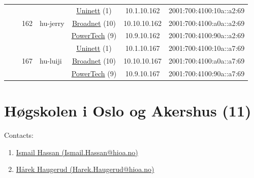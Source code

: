 \begin{small}
\begin{center}
\begin{longtable}{|c|c|c|c|c|c|c|c|}
  &  & \multirow{3}{*}{\tiny{162}} & \multicolumn{1}{|l|}{\multirow{3}{*}{\tiny{hu-jerry}}} & \multicolumn{2}{|c|}{\tiny{\href{https://www.uninett.no}{Uninett} (1)}} & \tiny{10.1.10.162} & \tiny{2001:700:4100:10a::a2:69} \\* \cline{5-5}\cline{6-6}\cline{7-7}\cline{8-8}
  &  &  &  & \multicolumn{2}{|c|}{\tiny{\href{https://www.broadnet.no}{Broadnet} (10)}} & \tiny{10.10.10.162} & \tiny{2001:700:4100:a0a::a2:69} \\* \cline{5-5}\cline{6-6}\cline{7-7}\cline{8-8}
  &  &  &  & \multicolumn{2}{|c|}{\tiny{\href{http://www.powertech.no}{PowerTech} (9)}} & \tiny{10.9.10.162} & \tiny{2001:700:4100:90a::a2:69} \\* \cline{3-3}\cline{4-4}\cline{5-5}\cline{6-6}\cline{7-7}\cline{8-8}
  &  & \multirow{3}{*}{\tiny{167}} & \multicolumn{1}{|l|}{\multirow{3}{*}{\tiny{hu-luiji}}} & \multicolumn{2}{|c|}{\tiny{\href{https://www.uninett.no}{Uninett} (1)}} & \tiny{10.1.10.167} & \tiny{2001:700:4100:10a::a7:69} \\* \cline{5-5}\cline{6-6}\cline{7-7}\cline{8-8}
  &  &  &  & \multicolumn{2}{|c|}{\tiny{\href{https://www.broadnet.no}{Broadnet} (10)}} & \tiny{10.10.10.167} & \tiny{2001:700:4100:a0a::a7:69} \\* \cline{5-5}\cline{6-6}\cline{7-7}\cline{8-8}
  &  &  &  & \multicolumn{2}{|c|}{\tiny{\href{http://www.powertech.no}{PowerTech} (9)}} & \tiny{10.9.10.167} & \tiny{2001:700:4100:90a::a7:69} \\ \hline
\end{longtable}
\end{center}
\end{small}



\section{Høgskolen i Oslo og Akershus (11)}
\label{sec:HiOA}

Contacts:
\begin{enumerate}
 \item {}\href{mailto:Ismail.Hassan@hioa.no}{Ismail Hassan (Ismail.Hassan@hioa.no)}
 \item {}\href{mailto:Harek.Haugerud@hioa.no}{Hårek Haugerud (Harek.Haugerud@hioa.no)}
\end{enumerate}

